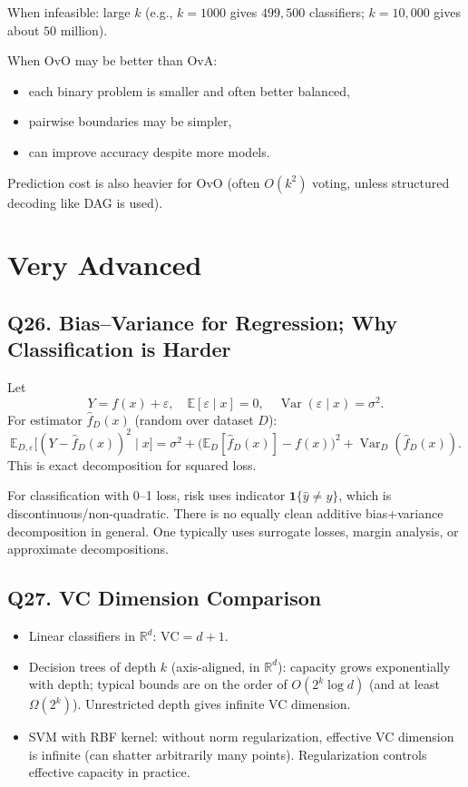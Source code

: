 \documentclass[11pt]{article}
\newcommand{\R}{\mathbb{R}}
\newcommand{\E}{\mathbb{E}}
\newcommand{\1}{\mathbf{1}}
\begin{document}
When infeasible: large $k$ (e.g., $k=1000$ gives $499{,}500$ classifiers; $k=10{,}000$ gives about $50$ million).

When OvO may be better than OvA:
\begin{itemize}
\item each binary problem is smaller and often better balanced,
\item pairwise boundaries may be simpler,
\item can improve accuracy despite more models.
\end{itemize}
Prediction cost is also heavier for OvO (often $O(k^2)$ voting, unless structured decoding like DAG is used).

\section{Very Advanced}

\subsection*{Q26. Bias--Variance for Regression; Why Classification is Harder}
Let
\[
Y=f(x)+\varepsilon,\quad \E[\varepsilon\mid x]=0,\quad \operatorname{Var}(\varepsilon\mid x)=\sigma^2.
\]
For estimator $\hat f_D(x)$ (random over dataset $D$):
\[
\E_{D,\varepsilon}\big[(Y-\hat f_D(x))^2\mid x\big]
=\sigma^2+\big(\E_D[\hat f_D(x)]-f(x)\big)^2+\operatorname{Var}_D(\hat f_D(x)).
\]
This is exact decomposition for squared loss.

For classification with 0--1 loss, risk uses indicator
$\1\{\hat y\neq y\}$, which is discontinuous/non-quadratic. There is no equally clean additive bias+variance decomposition in general. One typically uses surrogate losses, margin analysis, or approximate decompositions.

\subsection*{Q27. VC Dimension Comparison}
\begin{itemize}
\item Linear classifiers in $\R^d$: $\mathrm{VC}=d+1$.
\item Decision trees of depth $k$ (axis-aligned, in $\R^d$): capacity grows exponentially with depth; typical bounds are on the order of $O(2^k\log d)$ (and at least $\Omega(2^k)$). Unrestricted depth gives infinite VC dimension.
\item SVM with RBF kernel: without norm regularization, effective VC dimension is infinite (can shatter arbitrarily many points). Regularization controls effective capacity in practice.
\end{itemize}
\end{document}
